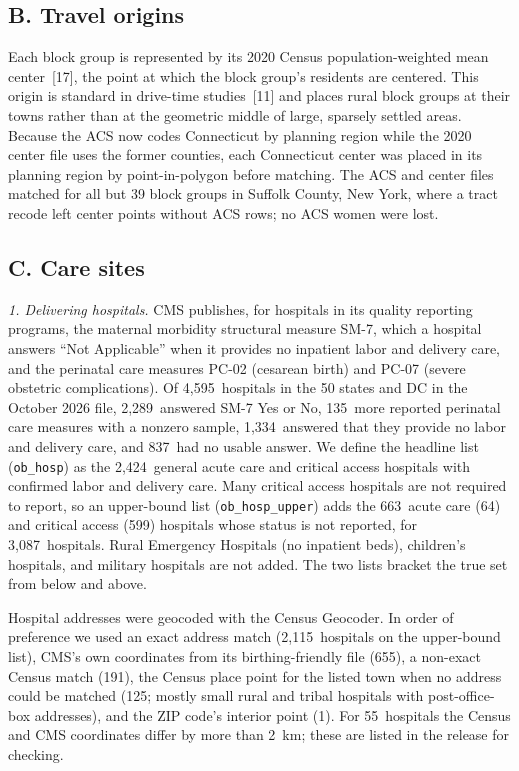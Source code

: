 \documentclass{article}
\begin{document}
\subsection*{B. Travel origins}
Each block group is represented by its 2020 Census population-weighted mean center~[17], the point at which the block group's residents are centered. This origin is standard in drive-time studies~[11] and places rural block groups at their towns rather than at the geometric middle of large, sparsely settled areas. Because the ACS now codes Connecticut by planning region while the 2020 center file uses the former counties, each Connecticut center was placed in its planning region by point-in-polygon before matching. The ACS and center files matched for all but 39 block groups in Suffolk County, New York, where a tract recode left center points without ACS rows; no ACS women were lost.

\subsection*{C. Care sites}
\textit{1. Delivering hospitals.} 
CMS publishes, for hospitals in its quality reporting programs, the maternal morbidity structural measure SM-7, which a hospital answers ``Not Applicable'' when it provides no inpatient labor and delivery care, and the perinatal care measures PC-02 (cesarean birth) and PC-07 (severe obstetric complications). Of 4,595\ hospitals in the 50 states and DC in the October 2026 file, 2,289\ answered SM-7 Yes or No, 135\ more reported perinatal care measures with a nonzero sample, 1,334\ answered that they provide no labor and delivery care, and 837\ had no usable answer. We define the headline list (\texttt{ob\_hosp}) as the 2,424\ general acute care and critical access hospitals with confirmed labor and delivery care. Many critical access hospitals are not required to report, so an upper-bound list (\texttt{ob\_hosp\_upper}) adds the 663\ acute care (64) and critical access (599) hospitals whose status is not reported, for 3,087\ hospitals. Rural Emergency Hospitals (no inpatient beds), children's hospitals, and military hospitals are not added. The two lists bracket the true set from below and above.

Hospital addresses were geocoded with the Census Geocoder. In order of preference we used an exact address match (2,115\ hospitals on the upper-bound list), CMS's own coordinates from its birthing-friendly file (655), a non-exact Census match (191), the Census place point for the listed town when no address could be matched (125; mostly small rural and tribal hospitals with post-office-box addresses), and the ZIP code's interior point (1). For 55\ hospitals the Census and CMS coordinates differ by more than 2~km; these are listed in the release for checking.
\end{document}
